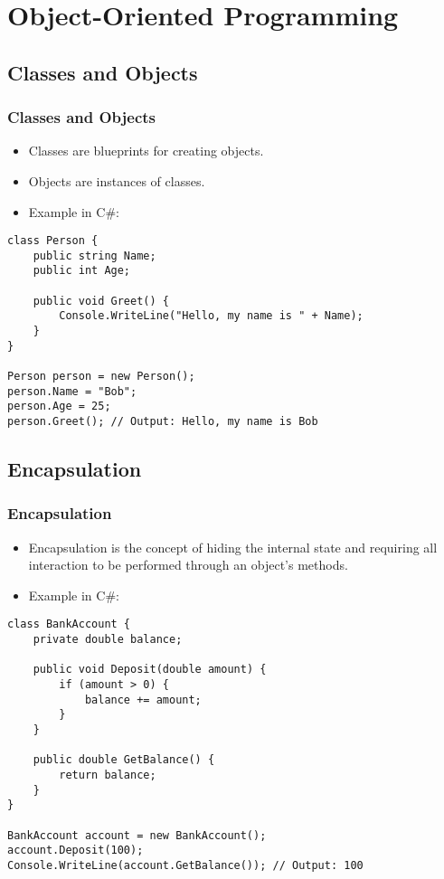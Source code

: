 \section{Object-Oriented Programming}

\subsection{Classes and Objects}
\begin{frame}[fragile]
\frametitle{Classes and Objects}
\begin{itemize}
    \item Classes are blueprints for creating objects.
    \item Objects are instances of classes.
    \item Example in C\#:
\end{itemize}
\begin{lstlisting}
class Person {
    public string Name;
    public int Age;

    public void Greet() {
        Console.WriteLine("Hello, my name is " + Name);
    }
}

Person person = new Person();
person.Name = "Bob";
person.Age = 25;
person.Greet(); // Output: Hello, my name is Bob
\end{lstlisting}
\end{frame}

\subsection{Encapsulation}
\begin{frame}[fragile]
\frametitle{Encapsulation}
\begin{itemize}
    \item Encapsulation is the concept of hiding the internal state and requiring all interaction to be performed through an object's methods.
    \item Example in C\#:
\end{itemize}
\begin{lstlisting}
class BankAccount {
    private double balance;

    public void Deposit(double amount) {
        if (amount > 0) {
            balance += amount;
        }
    }

    public double GetBalance() {
        return balance;
    }
}

BankAccount account = new BankAccount();
account.Deposit(100);
Console.WriteLine(account.GetBalance()); // Output: 100
\end{lstlisting}
\end{frame}
